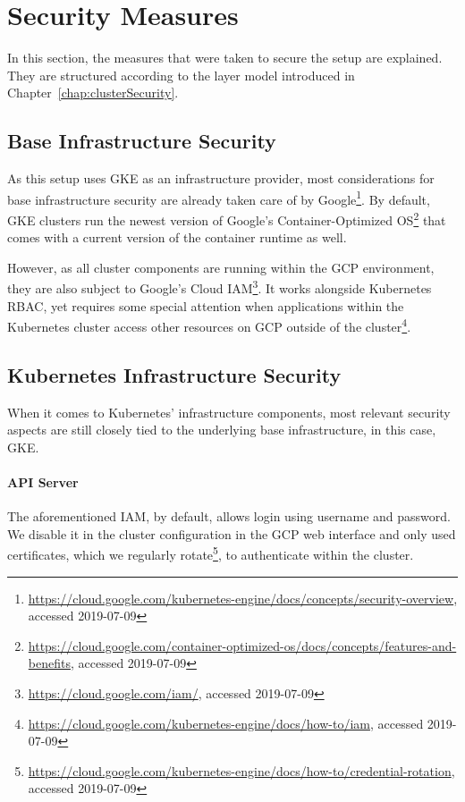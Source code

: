 \section{Security Measures}

In this section, the measures that were taken to secure the setup are explained. They are structured according to the layer model introduced in Chapter~\ref{chap:clusterSecurity}.

\subsection{Base Infrastructure Security}

As this setup uses \ac{GKE} as an infrastructure provider, most considerations for base infrastructure security are already taken care of by Google\footnote{\url{https://cloud.google.com/kubernetes-engine/docs/concepts/security-overview}, accessed 2019-07-09}. By default, \ac{GKE} clusters run the newest version of Google's Container-Optimized OS\footnote{\url{https://cloud.google.com/container-optimized-os/docs/concepts/features-and-benefits}, accessed 2019-07-09} that comes with a current version of the container runtime as well. 

However, as all cluster components are running within the \ac{GCP} environment, they are also subject to Google's Cloud \ac{IAM}\footnote{\url{https://cloud.google.com/iam/}, accessed 2019-07-09}. It works alongside Kubernetes \ac{RBAC}, yet requires some special attention when applications within the Kubernetes cluster access other resources on \ac{GCP} outside of the cluster\footnote{\url{https://cloud.google.com/kubernetes-engine/docs/how-to/iam}, accessed 2019-07-09}.

\subsection{Kubernetes Infrastructure Security}

When it comes to Kubernetes' infrastructure components, most relevant security aspects are still closely tied to the underlying base infrastructure, in this case, \ac{GKE}.

\paragraph{API Server}

The aforementioned \ac{IAM}, by default, allows login using username and password. We disable it in the cluster configuration in the \ac{GCP} web interface and only used certificates, which we regularly rotate\footnote{\url{https://cloud.google.com/kubernetes-engine/docs/how-to/credential-rotation}, accessed 2019-07-09}, to authenticate within the cluster.

